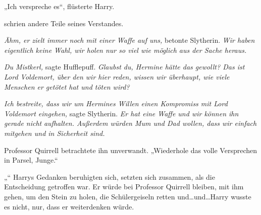 „Ich verspreche es“, flüsterte Harry.

\emph{} schrien andere Teile seines Verstandes.

\emph{Ähm, er zielt immer noch mit einer Waffe auf uns,} betonte Slytherin. \emph{Wir haben eigentlich keine Wahl, wir holen nur so viel wie möglich aus der Sache heraus.}

\emph{Du Mistkerl,} sagte Hufflepuff. \emph{Glaubst du, Hermine hätte das gewollt? Das ist Lord Voldemort, über den wir hier reden, wissen wir überhaupt, wie viele Menschen er getötet hat und töten wird?}

\emph{Ich bestreite, dass wir um Hermines Willen einen Kompromiss mit Lord Voldemort eingehen,} sagte Slytherin. \emph{Er hat eine Waffe und wir können ihn gerade nicht} \emph{aufhalten. Außerdem würden Mum und Dad wollen, dass wir einfach mitgehen und in Sicherheit sind.}

Professor Quirrell betrachtete ihn unverwandt.
„Wiederhole das volle Versprechen in Parsel, Junge.“

„“
Harrys Gedanken beruhigten sich, setzten sich zusammen, als die Entscheidung getroffen war. Er würde bei Professor Quirrell bleiben, mit ihm gehen, um den Stein zu holen, die Schülergeiseln retten und…und…Harry wusste es nicht, nur, dass er weiterdenken würde.


